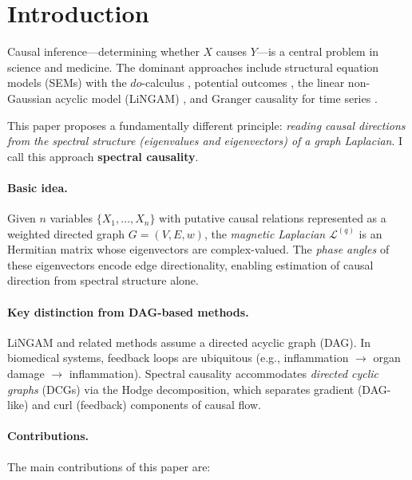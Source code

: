 \documentclass[twoside,11pt]{article}
\begin{document}
\section{Introduction}
\label{sec:intro}

Causal inference---determining whether $X$ causes $Y$---is a central problem
in science and medicine.  The dominant approaches include structural equation
models (SEMs) with the $do$-calculus \citep{Pearl2009}, potential outcomes
\citep{Rubin1974}, the linear non-Gaussian acyclic model (LiNGAM)
\citep{Shimizu2006}, and Granger causality for time series
\citep{Granger1969}.

This paper proposes a fundamentally different principle: \emph{reading causal
directions from the spectral structure (eigenvalues and eigenvectors) of a
graph Laplacian}.  I call this approach \textbf{spectral causality}.

\paragraph{Basic idea.}
Given $n$ variables $\{X_1,\dots,X_n\}$ with putative causal relations
represented as a weighted directed graph $G=(V,E,w)$, the \emph{magnetic
Laplacian} $\mathcal{L}^{(q)}$ is an Hermitian matrix whose eigenvectors are
complex-valued.  The \emph{phase angles} of these eigenvectors encode edge
directionality, enabling estimation of causal direction from spectral
structure alone.

\paragraph{Key distinction from DAG-based methods.}
LiNGAM and related methods assume a directed acyclic graph (DAG).  In
biomedical systems, feedback loops are ubiquitous (e.g., inflammation
$\to$ organ damage $\to$ inflammation).  Spectral causality accommodates
\emph{directed cyclic graphs} (DCGs) via the Hodge decomposition, which
separates gradient (DAG-like) and curl (feedback) components of causal flow.

\paragraph{Contributions.}
The main contributions of this paper are:
\end{document}
